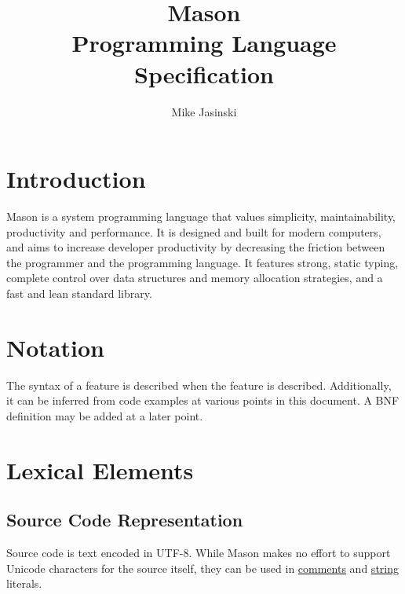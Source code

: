 \documentclass[leqno,12pt]{article}
\title{Mason \\ Programming Language Specification}
\author{Mike Jasinski}
\begin{document}
    \maketitle
    \thispagestyle{empty}
    \newpage
    \tableofcontents
    \newpage

    \section{Introduction}
    Mason is a system programming language that values simplicity, maintainability,
    productivity and performance. It is designed and built for modern computers,
    and aims to increase developer productivity by decreasing the friction between the programmer
    and the programming language. It features strong, static typing, complete control
    over data structures and memory allocation strategies, and a fast and lean standard
    library.

    \section{Notation}
    The syntax of a feature is described when the feature is described. Additionally,
    it can be inferred from code examples at various points in this document.
    A BNF definition may be added at a later point.

    \section{Lexical Elements}
    \subsection{Source Code Representation}
    Source code is text encoded in UTF-8. While Mason makes no effort to support Unicode
    characters for the source itself, they can be used in \hyperref[comments_section]{comments}
    and \hyperref[strings_section]{string} literals.
\end{document}
